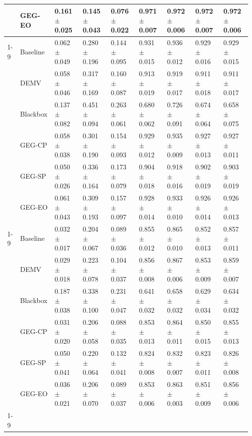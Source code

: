 \begin{table}
\begin{tabular}{lllllllll}
 & GEG-EO & 0.161 $\pm$ 0.025 & 0.145 $\pm$ 0.043 & 0.076 $\pm$ 0.022 & 0.971 $\pm$ 0.007 & 0.972 $\pm$ 0.006 & 0.972 $\pm$ 0.007 & 0.972 $\pm$ 0.006 \\
\cline{1-9}
\multirow[t]{6}{*}{obesity} & Baseline & 0.062 $\pm$ 0.049 & 0.280 $\pm$ 0.196 & 0.144 $\pm$ 0.095 & 0.931 $\pm$ 0.015 & 0.936 $\pm$ 0.012 & 0.929 $\pm$ 0.016 & 0.929 $\pm$ 0.015 \\
 & DEMV & 0.058 $\pm$ 0.046 & 0.317 $\pm$ 0.169 & 0.160 $\pm$ 0.087 & 0.913 $\pm$ 0.019 & 0.919 $\pm$ 0.017 & 0.911 $\pm$ 0.018 & 0.911 $\pm$ 0.017 \\
 & Blackbox & 0.137 $\pm$ 0.082 & 0.451 $\pm$ 0.094 & 0.263 $\pm$ 0.061 & 0.680 $\pm$ 0.062 & 0.726 $\pm$ 0.091 & 0.674 $\pm$ 0.064 & 0.658 $\pm$ 0.075 \\
 & GEG-CP & 0.058 $\pm$ 0.038 & 0.301 $\pm$ 0.190 & 0.154 $\pm$ 0.093 & 0.929 $\pm$ 0.012 & 0.935 $\pm$ 0.009 & 0.927 $\pm$ 0.013 & 0.927 $\pm$ 0.011 \\
 & GEG-SP & 0.050 $\pm$ 0.026 & 0.336 $\pm$ 0.164 & 0.173 $\pm$ 0.079 & 0.904 $\pm$ 0.018 & 0.918 $\pm$ 0.016 & 0.902 $\pm$ 0.019 & 0.903 $\pm$ 0.019 \\
 & GEG-EO & 0.061 $\pm$ 0.043 & 0.309 $\pm$ 0.193 & 0.157 $\pm$ 0.097 & 0.928 $\pm$ 0.014 & 0.933 $\pm$ 0.010 & 0.926 $\pm$ 0.014 & 0.926 $\pm$ 0.013 \\
\cline{1-9}
\multirow[t]{6}{*}{park} & Baseline & 0.032 $\pm$ 0.017 & 0.204 $\pm$ 0.067 & 0.089 $\pm$ 0.036 & 0.855 $\pm$ 0.012 & 0.865 $\pm$ 0.010 & 0.852 $\pm$ 0.013 & 0.857 $\pm$ 0.011 \\
 & DEMV & 0.029 $\pm$ 0.018 & 0.223 $\pm$ 0.078 & 0.104 $\pm$ 0.037 & 0.856 $\pm$ 0.008 & 0.867 $\pm$ 0.006 & 0.853 $\pm$ 0.009 & 0.859 $\pm$ 0.007 \\
 & Blackbox & 0.187 $\pm$ 0.038 & 0.338 $\pm$ 0.100 & 0.231 $\pm$ 0.047 & 0.641 $\pm$ 0.032 & 0.658 $\pm$ 0.032 & 0.629 $\pm$ 0.034 & 0.634 $\pm$ 0.032 \\
 & GEG-CP & 0.031 $\pm$ 0.020 & 0.206 $\pm$ 0.058 & 0.088 $\pm$ 0.035 & 0.853 $\pm$ 0.013 & 0.864 $\pm$ 0.011 & 0.850 $\pm$ 0.015 & 0.855 $\pm$ 0.013 \\
 & GEG-SP & 0.050 $\pm$ 0.041 & 0.220 $\pm$ 0.064 & 0.132 $\pm$ 0.041 & 0.824 $\pm$ 0.008 & 0.832 $\pm$ 0.007 & 0.823 $\pm$ 0.011 & 0.826 $\pm$ 0.008 \\
 & GEG-EO & 0.036 $\pm$ 0.021 & 0.206 $\pm$ 0.070 & 0.089 $\pm$ 0.037 & 0.853 $\pm$ 0.006 & 0.863 $\pm$ 0.003 & 0.851 $\pm$ 0.009 & 0.856 $\pm$ 0.006 \\
\cline{1-9}

\end{tabular}
\end{table}
